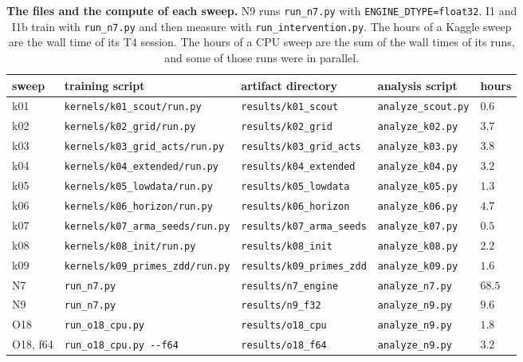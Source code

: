 \begin{table}[ht]
  \centering
  \footnotesize
  \caption{\textbf{The files and the compute of each sweep.} N9 runs \texttt{run\_n7.py}
    with \texttt{ENGINE\_DTYPE=float32}. I1 and I1b train with \texttt{run\_n7.py} and then
    measure with \texttt{run\_intervention.py}. The hours of a Kaggle sweep are the wall time
    of its T4 session. The hours of a CPU sweep are the sum of the wall times of its runs,
    and some of those runs were in parallel.}
  \label{tab:sweep-files}
  \begin{tabular}{lllll}
    \toprule
    sweep & training script & artifact directory & analysis script & hours \\
    \midrule
    k01 & \texttt{kernels/k01\_scout/run.py} & \texttt{results/k01\_scout} & \texttt{analyze\_scout.py} & $0.6$ \\
    k02 & \texttt{kernels/k02\_grid/run.py} & \texttt{results/k02\_grid} & \texttt{analyze\_k02.py} & $3.7$ \\
    k03 & \texttt{kernels/k03\_grid\_acts/run.py} & \texttt{results/k03\_grid\_acts} & \texttt{analyze\_k03.py} & $3.8$ \\
    k04 & \texttt{kernels/k04\_extended/run.py} & \texttt{results/k04\_extended} & \texttt{analyze\_k04.py} & $3.2$ \\
    k05 & \texttt{kernels/k05\_lowdata/run.py} & \texttt{results/k05\_lowdata} & \texttt{analyze\_k05.py} & $1.3$ \\
    k06 & \texttt{kernels/k06\_horizon/run.py} & \texttt{results/k06\_horizon} & \texttt{analyze\_k06.py} & $4.7$ \\
    k07 & \texttt{kernels/k07\_arma\_seeds/run.py} & \texttt{results/k07\_arma\_seeds} & \texttt{analyze\_k07.py} & $0.5$ \\
    k08 & \texttt{kernels/k08\_init/run.py} & \texttt{results/k08\_init} & \texttt{analyze\_k08.py} & $2.2$ \\
    k09 & \texttt{kernels/k09\_primes\_zdd/run.py} & \texttt{results/k09\_primes\_zdd} & \texttt{analyze\_k09.py} & $1.6$ \\
    N7 & \texttt{run\_n7.py} & \texttt{results/n7\_engine} & \texttt{analyze\_n7.py} & $68.5$ \\
    N9 & \texttt{run\_n7.py} & \texttt{results/n9\_f32} & \texttt{analyze\_n9.py} & $9.6$ \\
    O18 & \texttt{run\_o18\_cpu.py} & \texttt{results/o18\_cpu} & \texttt{analyze\_n9.py} & $1.8$ \\
    O18, f64 & \texttt{run\_o18\_cpu.py -{}-f64} & \texttt{results/o18\_f64} & \texttt{analyze\_n9.py} & $3.2$ \\

\end{tabular}
\end{table}

